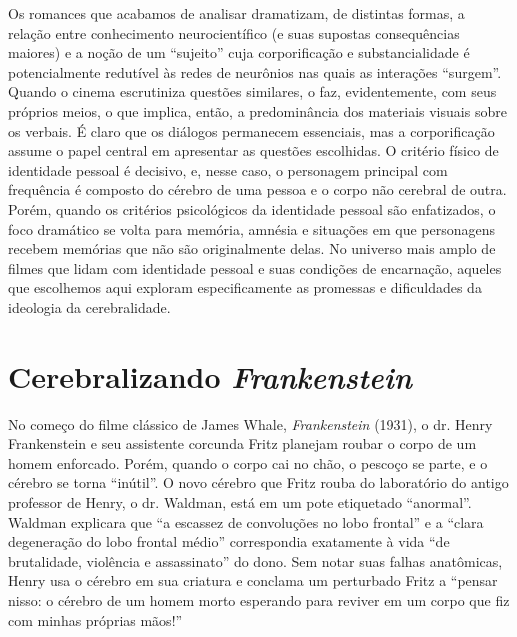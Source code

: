 Os romances que acabamos de analisar dramatizam, de distintas formas, a
relação entre conhecimento neurocientífico (e suas supostas
consequências maiores) e a noção de um ``sujeito'' cuja corporificação e
substancialidade é potencialmente redutível às redes de neurônios nas
quais as interações ``surgem''. Quando o cinema escrutiniza questões
similares, o faz, evidentemente, com seus próprios meios, o que implica,
então, a predominância dos materiais visuais sobre os verbais. É claro
que os diálogos permanecem essenciais, mas a corporificação assume o
papel central em apresentar as questões escolhidas. O critério físico de
identidade pessoal é decisivo, e, nesse caso, o personagem principal com
frequência é composto do cérebro de uma pessoa e o corpo não cerebral de
outra. Porém, quando os critérios psicológicos da identidade pessoal são
enfatizados, o foco dramático se volta para memória, amnésia e situações
em que personagens recebem memórias que não são originalmente delas. No
universo mais amplo de filmes que lidam com identidade pessoal e suas
condições de encarnação, aqueles que escolhemos aqui exploram
especificamente as promessas e dificuldades da ideologia da
cerebralidade.

\section{Cerebralizando \emph{Frankenstein}}

No começo do filme clássico de James Whale, \emph{Frankenstein} (1931),
o dr. Henry Frankenstein e seu assistente corcunda Fritz planejam roubar
o corpo de um homem enforcado. Porém, quando o corpo cai no chão, o
pescoço se parte, e o cérebro se torna ``inútil''. O novo cérebro que
Fritz rouba do laboratório do antigo professor de Henry, o dr. Waldman,
está em um pote etiquetado ``anormal''. Waldman explicara que ``a
escassez de convoluções no lobo frontal'' e a ``clara degeneração do
lobo frontal médio'' correspondia exatamente à vida ``de brutalidade,
violência e assassinato'' do dono. Sem notar suas falhas anatômicas,
Henry usa o cérebro em sua criatura e conclama um perturbado Fritz a
``pensar nisso: o cérebro de um homem morto esperando para reviver em um
corpo que fiz com minhas próprias mãos!''

